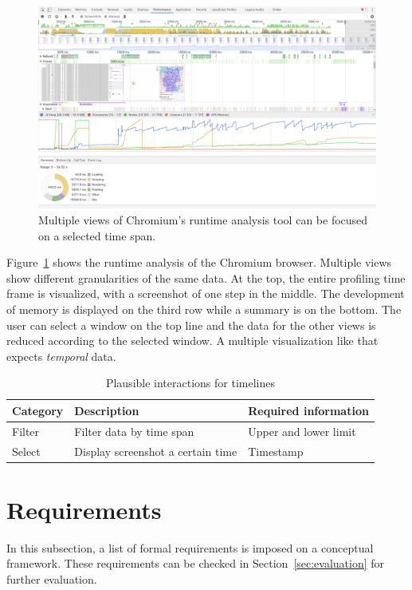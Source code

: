 \begin{figure}
  \centering
    \includegraphics[width=\textwidth]{figures/analysis/profiler}
  \caption{Multiple views of Chromium's runtime analysis tool can be focused on a selected time span.}
  \label{fig:analysis:timeline}
\end{figure}
Figure~\ref{fig:analysis:timeline} shows the runtime analysis of the Chromium browser.
Multiple views show different granularities of the same data.
At the top, the entire profiling time frame is visualized, with a screenshot of one step in the middle.
The development of memory is displayed on the third row while a summary is on the bottom.
The user can select a window on the top line and the data for the other views is reduced according to the selected window.
A multiple visualization like that expects \emph{temporal} data.

\begin{table}[H]
  \begin{tabular*}{\textwidth}{lll}
    \bf Category & \bf Description & \bf Required information \\
    \hline
    Filter & Filter data by time span & Upper and lower limit \\
    Select & Display screenshot a certain time & Timestamp  \\
  \end{tabular*}
  \caption{Plausible interactions for timelines}%
  \label{fig:analysis:timeline:interactions}
\end{table}


\section{Requirements}\label{sec:analysis:requirements}
In this subsection, a list of formal requirements is imposed on a conceptual \cmv{} framework.
These requirements can be checked in Section~\ref{sec:evaluation} for further evaluation.

